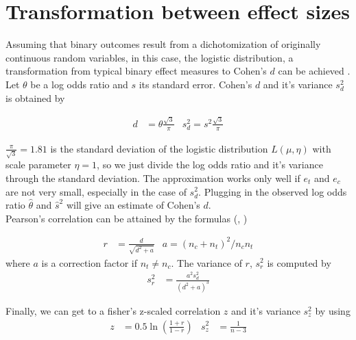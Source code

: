 \documentclass[11pt,a4paper,twoside]{book}\usepackage[]{graphicx}\usepackage[]{color}
\begin{document}
\section{Transformation between effect sizes} \label{sec:transformation.effectsizes}
Assuming that binary outcomes result from a dichotomization of originally continuous random variables, in this case, the logistic distribution, a transformation from typical binary effect measures to Cohen's $d$ can be achieved \cite[47]{Intro.meta}. \\
Let $\theta$ be a log odds ratio and $s$ its standard error. Cohen's $d$ and it's variance $s_d^2$ is obtained by

\begin{align}
d &= \theta \frac{\sqrt{3}}{\pi} & s_d^2 = s^2 \frac{\sqrt{3}}{\pi} \nonumber
\end{align}

$\frac{\pi}{\sqrt{3}} = 1.81$ is the standard deviation of the logistic distribution $L(\mu, \eta)$ with scale parameter $\eta = 1$, so we just divide the log odds ratio and it's variance through the standard deviation. The approximation works only well if $e_t$ and $e_c$ are not very small, especially in the case of $s_d^2$. Plugging in the observed log odds ratio $\hat{\theta}$ and $\hat{s}^2$ will give an estimate of Cohen's $d$.\\
Pearson's correlation can be attained by the formulas (\citet{olkin1985dtor}, \cite[48]{Intro.meta})

\begin{align}
r &= \frac{d}{\sqrt{d^2 + a}} & a = (n_c + n_t)^2 / n_c n_t \nonumber
\end{align}
where $a$ is a correction factor if $n_t \neq n_c$. The variance of $r$, $s_r^2$ is computed by
\begin{align}
s_r^2 &= \frac{a^2 s_d^2}{(d^2 + a)^3} \nonumber
\end{align}

Finally, we can get to a fisher's z-scaled correlation $z$ and it's variance $s_z^2$ by using
\begin{align}
z &= 0.5 \ln(\frac{1 + r}{1 - r}) & \nonumber
s_z^2 &= \frac{1}{n-3}
\end{align}
\end{document}
